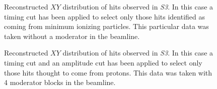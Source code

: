 \begin{figure}[t]
  \begin{minipage}[t]{0.49\textwidth}
    \centering
    \begin{adjustbox}{max totalsize={\textwidth}{.5\textheight},center}
      
    \end{adjustbox}
    \caption{Reconstructed $XY$ distribution of hits observed in \textit{S3}. In this case a timing cut has been applied to select only those hits identified as coming from minimum ionizing particles. This particular data was taken without a moderator in the beamline.}
    \label{fig:s3XY_pion}
  \end{minipage} 	
  \hfill
  \begin{minipage}[t]{0.49\textwidth}
    \centering
    \begin{adjustbox}{max totalsize={\textwidth}{.5\textheight},center}
      
    \end{adjustbox}
    \caption{Reconstructed $XY$ distribution of hits observed in \textit{S3}. In this case a timing cut and an amplitude cut has been applied to select only those hits thought to come from protons. This data was taken with 4 moderator blocks in the beamline.}
    \label{fig:s3XY_proton}
  \end{minipage}
\end{figure}


